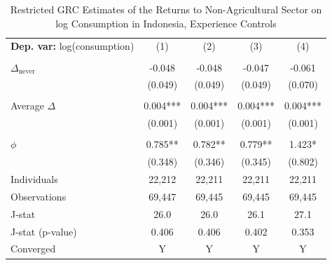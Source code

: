 \begin{table}[htbp] \centering \begin{threeparttable}
 \caption{Restricted GRC Estimates of the Returns to Non-Agricultural Sector on log Consumption in Indonesia, Experience Controls} 
 \label{tab:GRC_IDN_consumption_nonag_unb_exp} 
\begin{tabular}{l cccc} \toprule  \textbf{Dep. var:}  log(consumption) 
                    &\multicolumn{1}{c}{(1)}   &\multicolumn{1}{c}{(2)}   &\multicolumn{1}{c}{(3)}   &\multicolumn{1}{c}{(4)}   \\
                    &               &               &               &               \\
\addlinespace
$\Delta_{\text{never}}$&      -0.048   &      -0.048   &      -0.047   &      -0.061   \\
                    &     (0.049)   &     (0.049)   &     (0.049)   &     (0.070)   \\
                    &               &               &               &               \\
\addlinespace
Average $\Delta$    &       0.004***&       0.004***&       0.004***&       0.004***\\
                    &     (0.001)   &     (0.001)   &     (0.001)   &     (0.001)   \\
                    &               &               &               &               \\
\addlinespace
$\phi$              &       0.785** &       0.782** &       0.779** &       1.423*  \\
                    &     (0.348)   &     (0.346)   &     (0.345)   &     (0.802)   \\
\addlinespace
Individuals         &      22,212   &      22,211   &      22,211   &      22,211   \\
Observations        &      69,447   &      69,445   &      69,445   &      69,445   \\
J-stat              &        26.0   &        26.0   &        26.1   &        27.1   \\
J-stat (p-value)    &       0.406   &       0.406   &       0.402   &       0.353   \\
Converged           &           Y   &           Y   &           Y   &           Y   \\

\end{tabular}
\end{threeparttable}
\end{table}
